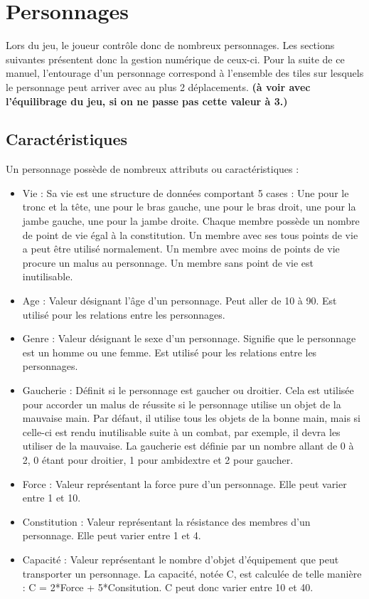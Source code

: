 \section{Personnages}
Lors du jeu, le joueur contrôle donc de nombreux personnages. Les sections suivantes présentent donc la gestion numérique de ceux-ci. Pour la suite de ce manuel, l'entourage d'un personnage correspond à l'ensemble des tiles sur lesquels le personnage peut arriver avec au plus 2 déplacements. \textbf{(à voir avec l'équilibrage du jeu, si on ne passe pas cette valeur à 3.)}
\subsection{Caractéristiques}
Un personnage possède de nombreux attributs ou caractéristiques :
\begin{itemize}
  \item Vie : Sa vie est une structure de données comportant 5 cases : Une pour le tronc et la tête, une pour le bras gauche, une pour le bras droit, une pour la jambe gauche, une pour la jambe droite. Chaque membre possède un nombre de point de vie égal à la constitution. Un membre avec ses tous points de vie a peut être utilisé normalement. Un membre avec moins de points de vie procure un malus au personnage. Un membre sans point de vie est inutilisable.
  \item Age : Valeur désignant l'âge d'un personnage. Peut aller de 10 à 90. Est utilisé pour les relations entre les personnages.
  \item Genre : Valeur désignant le sexe d'un personnage. Signifie que le personnage est un homme ou une femme. Est utilisé pour les relations entre les personnages.
  \item Gaucherie : Définit si le personnage est gaucher ou droitier. Cela est utilisée pour accorder un malus de réussite si le personnage utilise un objet de la mauvaise main. Par défaut, il utilise tous les objets de la bonne main, mais si celle-ci est rendu inutilisable suite à un combat, par exemple, il devra les utiliser de la mauvaise. La gaucherie est définie par un nombre allant de 0 à 2, 0 étant pour droitier, 1 pour ambidextre et 2 pour gaucher.
  \item Force : Valeur représentant la force pure d'un personnage. Elle peut varier entre 1 et 10.
  \item Constitution : Valeur représentant la résistance des membres d'un personnage. Elle peut varier entre 1 et 4.
  \item Capacité : Valeur représentant le nombre d'objet d'équipement que peut transporter un personnage. La capacité, notée C, est calculée de telle manière : C = 2*Force +  5*Consitution. C peut donc varier entre 10 et 40.

\end{itemize}
